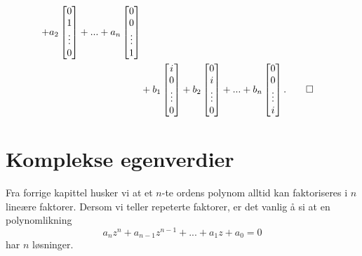 \begin{ex}
\begin{align*}
+
a_2
\begin{bmatrix}
0    \\ 1  \\ \vdots \\ 0
\end{bmatrix}
+...+
a_n
\begin{bmatrix}
0    \\ 0  \\ \vdots \\ 1
\end{bmatrix}
\\ &+
b_1
\begin{bmatrix}
i    \\ 0  \\ \vdots \\ 0
\end{bmatrix}
+
b_2
\begin{bmatrix}
0    \\ i  \\ \vdots \\ 0
\end{bmatrix}
+...+
b_n
\begin{bmatrix}
0    \\ 0  \\ \vdots \\ i
\end{bmatrix}. \qedhere
\end{align*}
\end{ex}







\section*{Komplekse egenverdier}
Fra forrige kapittel husker vi at et $n$-te ordens polynom alltid kan faktoriseres i $n$ lineære faktorer. Dersom vi teller repeterte faktorer, er det vanlig å si at en polynomlikning 
\[
a_n z^n+a_{n-1} z^{n-1}+...+a_1 z +a_0=0
\]
har $n$ løsninger.

